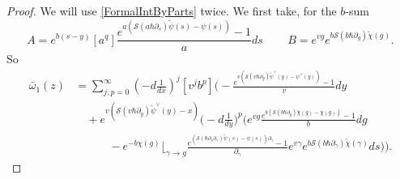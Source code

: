 \documentclass[10pt,a4paper,oneside,no-math,reqno]{amsart}%
\theoremstyle{plain}
\theoremstyle{definition}
\theoremstyle{remark}
\numberwithin{equation}{section}
\newcommand{\mc}[1]{\mathcal{#1}}
\newcommand{\1}{\mathds{1}}
\newcommand{\<}{\langle}
\renewcommand{\>}{\rangle}
\newcommand{\del}{\partial}
\begin{document}
\begin{proof}
	We will use \cref{FormalIntByParts} twice. We first take, for the $b$-sum
	\begin{equation}
		A
		=
		e^{b(s-y)} [a^q ] 
		\frac{e^{a ( \mc{S}(a\hbar \del_s) \tilde{\psi}(s) - \psi (s) )} - 1}{a} ds \,
		\qquad
		B
		=
		e^{vg} e^{b \mc{S}(b\hbar \del_g) \tilde{\chi}(g) } .
	\end{equation}
	So
  \begin{equation}\label{FirstStepForn=1}
		\begin{split}
			\bar{\omega}_1 (z)
      &=
      \sum_{j,p=0}^\infty (-d \frac{1}{dx})^j [v^j b^p ] 
			\Bigg( - \frac{e^{v ( \mc{S}(v\hbar \del_{y}) \tilde{\psi}^\vee(y) - \psi^\vee (y) )} - 1}{v} dy
      \\
      &\quad
      + 
      e^{v ( \mc{S}(v\hbar \del_{y}) \tilde{\psi}^\vee(y) - x)} \big( -d \frac{1}{dy} \big)^p 
			\bigg( e^{vg} \frac{e^{b ( \mc{S}(b\hbar \del_g) \tilde{\chi}(g) - \chi (g) )} -1}{b} dg 
      \\
      &\qquad \quad
      - 
      e^{-b\chi(g)} \Big\lfloor_{\gamma \to g} \frac{e^{( \mc{S}(\hbar \del_s \del_\gamma) \tilde{\psi}(s) - \psi (s) )\del_\gamma} - 1}{\del_\gamma} e^{v\gamma} e^{b \mc{S}(b\hbar \del_\gamma) \tilde{\chi}(\gamma) }
			ds \bigg) \Bigg) .
		\end{split}

\end{equation}
\end{proof}
\end{document}
